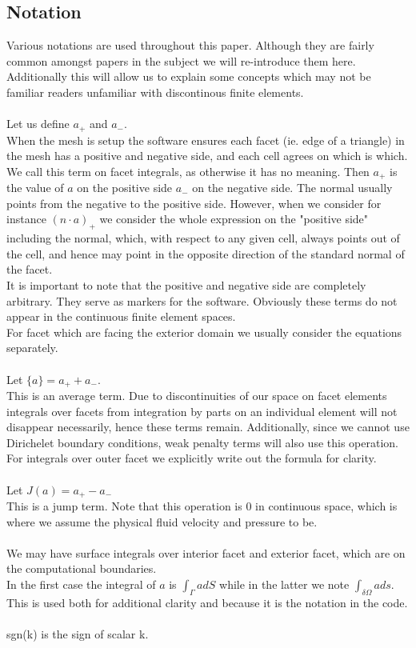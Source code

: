 \documentclass[11pt,twoside,a4paper]{article}
\begin{document}
\subsection{Notation}
Various notations are used throughout this paper. Although they are fairly common amongst papers in the subject we will re-introduce them here. Additionally this will allow us to explain some concepts which may not be familiar readers unfamiliar with discontinous finite elements.\\
\\
Let us define $a_+$ and $a_-$.\\
When the mesh is setup the software ensures each facet (ie. edge of a triangle) in the mesh has a positive and negative side, and each cell agrees on which is which. We call this term on facet integrals, as otherwise it has no meaning. Then $a_+$ is the value of $a$ on the positive side $a_-$ on the negative side. The normal usually points from the negative to the positive side. However, when we consider for instance $(n \cdot a)_+$ we consider the whole expression on the "positive side" including the normal, which, with respect to any given cell, always points out of the cell, and hence may point in the opposite direction of the standard normal of the facet.\\
It is important to note that the positive and negative side are completely arbitrary. They serve as markers for the software. Obviously these terms do not appear in the continuous finite element spaces.\\
For facet which are facing the exterior domain we usually consider the equations separately.\\
\\
Let $\{ a \} = a_+ + a_-$. \\
This is an average term. Due to discontinuities of our space on facet elements integrals over facets from integration by parts on an individual element will not disappear necessarily, hence these terms remain. Additionally, since we cannot use Dirichelet boundary conditions, weak penalty terms will also use this operation.\\
For integrals over outer facet we explicitly write out the formula for clarity.\\
\\
Let $J(a) = a_+ - a_-$\\
This is a jump term. Note that this operation is $0$ in continuous space, which is where we assume the physical fluid velocity and pressure to be.\\
\\
We may have surface integrals over interior facet and exterior facet, which are on the computational boundaries.\\
In the first case the integral of $a$ is $\int_\Gamma a dS$ while in the latter we note $\int_{\delta \Omega} a ds$.\\
This is used both for additional clarity and because it is the notation in the code.\\
\\
sgn(k) is the sign of scalar k.
\end{document}
